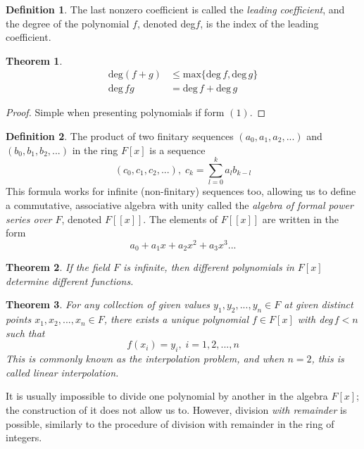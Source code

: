 \documentclass{article}
\newtheorem{theorem}{Theorem}[section]
\theoremstyle{remark}
\theoremstyle{definition}
\newtheorem{definition}{Definition}[section]
\begin{document}
\begin{definition}
The last nonzero coefficient is called the \textit{leading coefficient}, and the degree of the polynomial $f$, denoted deg$f$, is the index of the leading coefficient. 
\end{definition}

\begin{theorem}
\begin{align}
    \text{deg}(f+g) & \leq \text{max}\{\text{deg}\,f, \text{deg} \,g\} \\
    \text{deg} \,f g & = \text{deg} \,f + \text{deg} \,g
\end{align}
\end{theorem}
\begin{proof}
Simple when presenting polynomials if form $(1)$. 
\end{proof}

\begin{definition}
The product of two finitary sequences $(a_0, a_1, a_2, ...)$ and $(b_0, b_1, b_2, ...)$ in the ring $F[x]$ is a sequence 
\[ (c_0, c_1, c_2, ...), \; c_k = \sum_{l = 0}^{k} a_l b_{k-l}\]
This formula works for infinite (non-finitary) sequences too, allowing us to define a commutative, associative algebra with unity called the \textit{algebra of formal power series over $F$}, denoted $F[[x]]$. The elements of $F[[x]]$ are written in the form 
\[ a_0 + a_1 x + a_2 x^2 + a_3 x^3...\]
\end{definition}

\begin{theorem}
If the field $F$ is infinite, then different polynomials in $F[x]$ determine different functions. 
\end{theorem}

\begin{theorem}
For any collection of given values $y_1, y_2, ..., y_n \in F$ at given distinct points $x_1, x_2, ..., x_n \in F$, there exists a unique polynomial $f \in F[x]$ with deg$\, f < n$ such that
\[ f(x_i) = y_i, \; i = 1, 2, ..., n\]
This is commonly known as the \textit{interpolation problem}, and when $n = 2$, this is called \textit{linear interpolation}. 
\end{theorem}

It is usually impossible to divide one polynomial by another in the algebra $F[x]$; the construction of it does not allow us to. However, division \textit{with remainder} is possible, similarly to the procedure of division with remainder in the ring of integers. 
\end{document}
